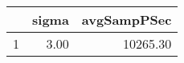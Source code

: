 \begin{table}[h]
\centering
\begin{tabular}{rrr}
  \hline
 & sigma & avgSampPSec \\ 
  \hline
1 & 3.00 & 10265.30 \\ 
   \hline
\end{tabular}
\end{table}
